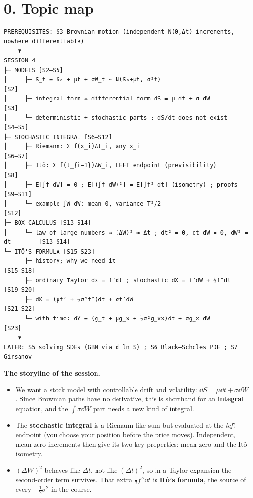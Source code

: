 \documentclass[10pt]{article}
\begin{document}
\section*{0. Topic map}
\begin{lstlisting}
PREREQUISITES: S3 Brownian motion (independent N(0,Δt) increments, nowhere differentiable)
    ▼
SESSION 4
├─ MODELS [S2–S5]
│     ├─ S_t = S₀ + μt + σW_t ~ N(S₀+μt, σ²t)                                   [S2]
│     ├─ integral form ⇔ differential form dS = μ dt + σ dW                      [S3]
│     └─ deterministic + stochastic parts ; dS/dt does not exist                 [S4–S5]
├─ STOCHASTIC INTEGRAL [S6–S12]
│     ├─ Riemann: Σ f(x_i)Δt_i, any x_i                                          [S6–S7]
│     ├─ Itô: Σ f(t_{i−1})ΔW_i, LEFT endpoint (previsibility)                    [S8]
│     ├─ E[∫f dW] = 0 ; E[(∫f dW)²] = E[∫f² dt] (isometry) ; proofs              [S9–S11]
│     └─ example ∫W dW: mean 0, variance T²/2                                    [S12]
├─ BOX CALCULUS [S13–S14]
│     └─ law of large numbers ⇒ (ΔW)² ≈ Δt ; dt² = 0, dt dW = 0, dW² = dt        [S13–S14]
└─ ITÔ'S FORMULA [S15–S23]
      ├─ history; why we need it                                                [S15–S18]
      ├─ ordinary Taylor dx = f′dt ; stochastic dX = f′dW + ½f″dt               [S19–S20]
      ├─ dX = (μf′ + ½σ²f″)dt + σf′dW                                            [S21–S22]
      └─ with time: dY = (g_t + μg_x + ½σ²g_xx)dt + σg_x dW                      [S23]
    ▼
LATER: S5 solving SDEs (GBM via d ln S) ; S6 Black–Scholes PDE ; S7 Girsanov
\end{lstlisting}
\textbf{The storyline of the session.}
\begin{itemize}
\item We want a stock model with controllable drift and volatility: $\dd S=\mu\dd t+\sigma\dd W$. Since Brownian paths have no derivative, this is shorthand for an \textbf{integral} equation, and the $\int\sigma\dd W$ part needs a new kind of integral.
\item The \textbf{stochastic integral} is a Riemann-like sum but evaluated at the \emph{left} endpoint (you choose your position before the price moves). Independent, mean-zero increments then give its two key properties: mean zero and the It\^o isometry.
\item $(\Delta W)^2$ behaves like $\Delta t$, not like $(\Delta t)^2$, so in a Taylor expansion the second-order term survives. That extra $\frac12f''\dd t$ is \textbf{It\^o's formula}, the source of every $-\frac12\sigma^2$ in the course.
\end{itemize}
\end{document}
